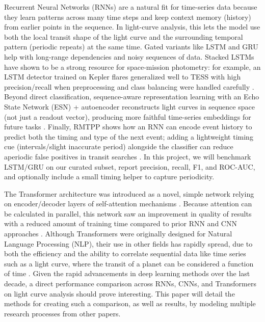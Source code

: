 \documentclass[letterpaper]{article} %
\begin{document}
Recurrent Neural Networks (RNNs) are a natural fit for time-series data because they learn patterns across many time steps and keep context memory (history) from earlier points in the sequence. In light-curve analysis, this lets the model use both the local transit shape of the light curve and the surrounding temporal pattern (periodic repeats) at the same time. Gated variants like LSTM and GRU help with long-range dependencies and noisy sequences of data. Stacked LSTMs have shown to be a strong resource for space-mission photometry: for example, an LSTM detector trained on Kepler flares generalized well to TESS with high precision/recall when preprocessing and class balancing were handled carefully \cite{Vida2021findingflaresrecurrent}. Beyond direct classification, sequence-aware representation learning with an Echo State Network (ESN) + autoencoder reconstructs light curves in sequence space (not just a readout vector), producing more faithful time-series embeddings for future tasks \cite{kugler2016explorativeapproachkepler}. Finally, RMTPP shows how an RNN can encode event history to predict both the timing and type of the next event; adding a lightweight timing cue (intervals/slight inaccurate period) alongside the classifier can reduce aperiodic false positives in transit searches \cite{Du2016markedtemporalpoint}. In this project, we will benchmark LSTM/GRU on our curated subset, report precision, recall, F1, and ROC-AUC, and optionally include a small timing helper to capture periodicity.

The Transformer architecture was introduced as a novel, simple network relying on encoder/decoder layers of self-attention mechanisms \cite{vaswani2017attentionneed}. Because attention can be calculated in parallel, this network saw an improvement in quality of results with a reduced amount of training time compared to prior RNN and CNN approaches \cite{vaswani2017attentionneed}. Although Transformers were originally designed for Natural Language Processing (NLP), their use in other fields has rapidly spread, due to both the efficiency and the ability to correlate sequential data like time series such as a light curve, where the transit of a planet can be considered a function of time \cite{salinas2023distinguishingtransitfalsepositives}. Given the rapid advancements in deep learning methods over the last decade, a direct performance comparison across RNNs, CNNs, and Transformers on light curve analysis should prove interesting. This paper will detail the methods for creating such a comparison, as well as results, by modeling multiple research processes from other papers.
\end{document}
